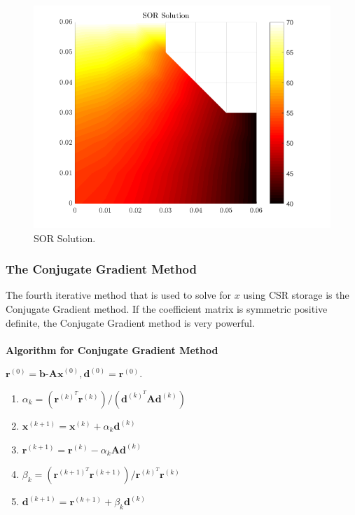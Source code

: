 \documentclass[12pt,a4paper]{article}
\begin{document}
\begin{figure}[H]
	\includegraphics[width=\linewidth]{images/sorsolution.png}
	\caption{SOR Solution.}
	\label{fig:sor}
\end{figure}

\subsubsection{The Conjugate Gradient Method}
The fourth iterative method that is used to solve for $x$ using CSR storage is the Conjugate Gradient method. If the coefficient matrix is symmetric positive definite, the Conjugate Gradient method is very powerful.
\\\\
\textbf{Algorithm for Conjugate Gradient Method}
\begin{center}
$\textbf{r}^{(0)}=\textbf{b-Ax}^{(0)}, \textbf{d}^{(0)}=\textbf{r}^{(0)}$.
\end{center}
\begin{enumerate}
\item $\alpha_{k} = (\textbf{r}^{(k)^{T}}\textbf{r}^{(k)})/(\textbf{d}^{(k)^{T}}\textbf{Ad}^{(k)})$
\item $\textbf{x}^{(k+1)}=\textbf{x}^{(k)}+\alpha_{k}\textbf{d}^{(k)}$
\item $\textbf{r}^{(k+1)}=\textbf{r}^{(k)}-\alpha_{k}\textbf{Ad}^{(k)}$
\item $\beta_{k} = (\textbf{r}^{(k+1)^{T}}\textbf{r}^{(k+1)})/\textbf{r}^{(k)^{T}}\textbf{r}^{(k)}$
\item $\textbf{d}^{(k+1)}=\textbf{r}^{(k+1)}+\beta_{k}\textbf{d}^{(k)}$
\end{enumerate}
\end{document}

